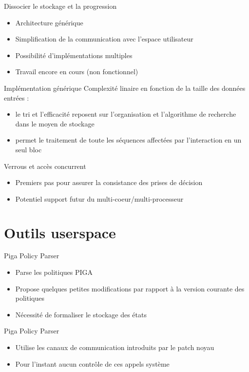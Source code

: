 \documentclass{beamer}
\begin{document}
\begin{frame}{Dissocier le stockage et la progression}
	\begin{itemize}
		\item Architecture générique
		\item Simplification de la communication avec l'espace utilisateur
		\item Possibilité d'implémentations multiples
		\item Travail encore en cours (non fonctionnel)
	\end{itemize}
\end{frame}

\begin{frame}{Implémentation générique}
	Complexité linaire en fonction de la taille des données entrées :
	\begin{itemize}
		\item le tri et l'efficacité reposent sur l'organisation et l'algorithme
de recherche dans le moyen de stockage
		\item permet le traitement de toute les séquences affectées par
l'interaction en un seul bloc
	\end{itemize}
\end{frame}

\begin{frame}{Verrous et accès concurrent}
	\begin{itemize}
		\item Premiers pas pour assurer la consistance des prises de décision
		\item Potentiel support futur du multi-coeur/multi-processeur
	\end{itemize}
\end{frame}

\section{Outils userspace}
\begin{frame}{Piga Policy Parser}
	\begin{itemize}
		\item Parse les politiques PIGA
		\item Propose quelques petites modifications par rapport à la version
courante des politiques
		\item Nécessité de formaliser le stockage des états
	\end{itemize}
\end{frame}

\begin{frame}{Piga Policy Parser}
	\begin{itemize}
		\item Utilise les canaux de communication introduits par le patch noyau
		\item Pour l'instant aucun contrôle de ces appels système
	\end{itemize}
\end{frame}
\end{document}
